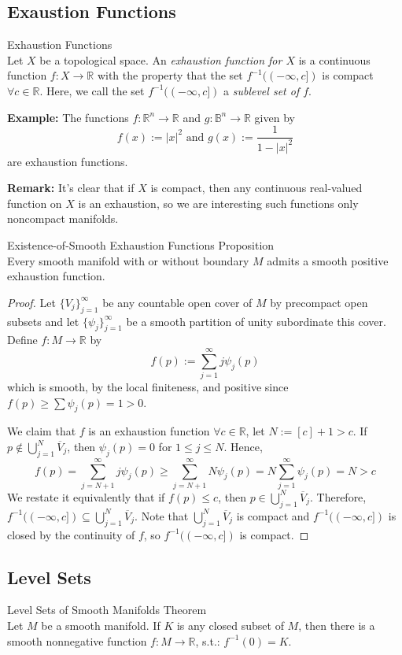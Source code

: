 \subsection{Exaustion Functions}

\begin{definition}{Exhaustion Functions}\\
Let $X$ be a topological space. An \textit{exhaustion function for $X$} is a continuous function $f:X\to \mathbb{R}$ with the property that the set $f^{-1}((-\infty,c])$ is compact $\forall c\in \mathbb{R}$. Here, we call the set $f^{-1}((-\infty ,c])$ a \textit{sublevel set of $f$}.
\end{definition}

\noindent\textbf{Example:} The functions $f:\mathbb{R}^n \to \mathbb{R}$ and $g:\mathbb{B}^n \to \mathbb{R}$ given by
\[
f(x):= |x|^2 \text{ and } g(x):= \frac{1}{1- |x|^2}
\]
are exhaustion functions.

\noindent\textbf{Remark:} It's clear that if $X$ is compact, then any continuous real-valued function on $X$ is an exhaustion, so we are interesting such functions only noncompact manifolds.

\begin{proposition}{Existence-of-Smooth Exhaustion Functions Proposition}\\
Every smooth manifold with or without boundary $M$ admits a smooth positive exhaustion function.
\end{proposition}

\begin{proof}
    Let $\{V_j\}_{j=1}^\infty$ be any countable open cover of $M$ by precompact open subsets and let $\{\psi_j\}_{j=1}^\infty$ be a smooth partition of unity subordinate this cover. Define $f:M\to \mathbb{R}$ by
    \[
    f(p):= \sum_{j=1}^\infty j\psi_j(p)
    \]
    which is smooth, by the local finiteness, and positive since $f(p) \geq \sum\psi_j (p) =1>0$.

    We claim that $f$ is an exhaustion function $\forall c\in \mathbb{R}$, let $N:= [c]+1> c$. If $p \notin \bigcup_{j=1}^N \overline{V}_j$, then $\psi_j(p)=0$ for $1\leq j\leq N$. Hence, 
    \[
    f(p)= \sum_{j=N+1}^\infty j\psi_j(p) \geq \sum_{j=N+1}^\infty N\psi_j(p)= N\sum_{j=1}^\infty \psi_j(p)=N>c
    \]
    We restate it equivalently that if $f(p)\leq c$, then $p\in \bigcup_{j=1}^N \overline{V}_j$. Therefore, $f^{-1} ((-\infty,c]) \subseteq \bigcup_{j=1}^N \overline{V}_j$. Note that $\bigcup_{j=1}^N \overline{V}_j$ is compact and $f^{-1}((-\infty, c])$ is closed by the continuity of $f$, so $f^{-1} ((-\infty,c])$ is compact.
\end{proof}

\subsection{Level Sets}

\begin{theorem}{Level Sets of Smooth Manifolds Theorem}\\
Let $M$ be a smooth manifold. If $K$ is any closed subset of $M$, then there is a smooth nonnegative function $f:M\to \mathbb{R}$, s.t.: $f^{-1}(0)=K$.
\end{theorem}